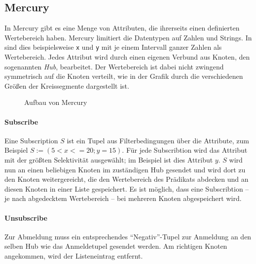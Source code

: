 \subsection{Mercury}
\label{chap:related:mercury}
In Mercury \cite{Bharambe2004Mercury} gibt es eine Menge von Attributen, die ihrerseits einen definierten Wertebereich haben. Mercury limitiert die Datentypen auf Zahlen und Strings. In  sind dies beispielsweise \texttt{x} und \texttt{y} mit je einem Intervall ganzer Zahlen als Wertebereich. Jedes Attribut wird durch einen eigenen Verbund aus Knoten, den sogenannten \emph{Hub}, bearbeitet. Der Wertebereich ist dabei nicht zwingend symmetrisch auf die Knoten verteilt, wie in der Grafik durch die verschiedenen Größen der Kreissegmente dargestellt ist. 

\begin{figure}[htbp]
\centering
{}
\caption{Aufbau von Mercury}
\label{fig:mercury}
\end{figure}

\paragraph{Subscribe}
Eine Subscription $S$ ist ein Tupel aus Filterbedingungen über die Attribute, zum Beispiel $S := (5 < x <= 20; y = 15)$. Für jede Subscribtion wird das Attribut mit der größten Selektivität ausgewählt; im Beispiel ist dies Attribut $y$. $S$ wird nun an einen beliebigen Knoten im zuständigen Hub gesendet und wird dort zu den Knoten weitergereicht, die den Wertebereich des Prädikats abdecken und an diesen Knoten in einer Liste gespeichert. Es ist möglich, dass eine Subscribtion -- je nach abgedecktem Wertebereich -- bei mehreren Knoten abgespeichert wird.

\paragraph{Unsubscribe}
Zur Abmeldung muss ein entsprechendes \enquote{Negativ}-Tupel zur Anmeldung an den selben Hub wie das Anmeldetupel gesendet werden. Am richtigen Knoten angekommen, wird der Listeneintrag entfernt.

